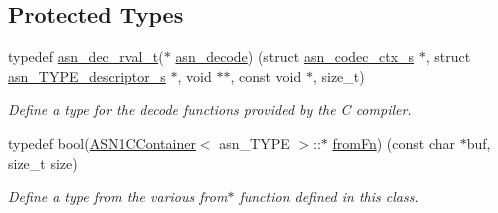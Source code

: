 \subsection*{Protected Types}
\begin{DoxyCompactItemize}
\item 
typedef \hyperlink{structasn__dec__rval__s}{asn\+\_\+dec\+\_\+rval\+\_\+t}($\ast$ \hyperlink{classASN1CContainer_a9edaf11eed4f5ded9a32200e43832e72}{asn\+\_\+decode}) (struct \hyperlink{structasn__codec__ctx__s}{asn\+\_\+codec\+\_\+ctx\+\_\+s} $\ast$, struct \hyperlink{structasn__TYPE__descriptor__s}{asn\+\_\+\+T\+Y\+P\+E\+\_\+descriptor\+\_\+s} $\ast$, void $\ast$$\ast$, const void $\ast$, size\+\_\+t)\hypertarget{classASN1CContainer_a9edaf11eed4f5ded9a32200e43832e72}{}\label{classASN1CContainer_a9edaf11eed4f5ded9a32200e43832e72}

\begin{DoxyCompactList}\small\item\em Define a type for the decode functions provided by the C compiler. \end{DoxyCompactList}\item 
typedef bool(\hyperlink{classASN1CContainer}{A\+S\+N1\+C\+Container}$<$ asn\+\_\+\+T\+Y\+PE $>$\+::$\ast$ \hyperlink{classASN1CContainer_a5830db096eef3cee08cb7e948624aa3c}{from\+Fn}) (const char $\ast$buf, size\+\_\+t size)\hypertarget{classASN1CContainer_a5830db096eef3cee08cb7e948624aa3c}{}\label{classASN1CContainer_a5830db096eef3cee08cb7e948624aa3c}

\begin{DoxyCompactList}\small\item\em Define a type from the various from$\ast$ function defined in this class. \end{DoxyCompactList}\end{DoxyCompactItemize}
